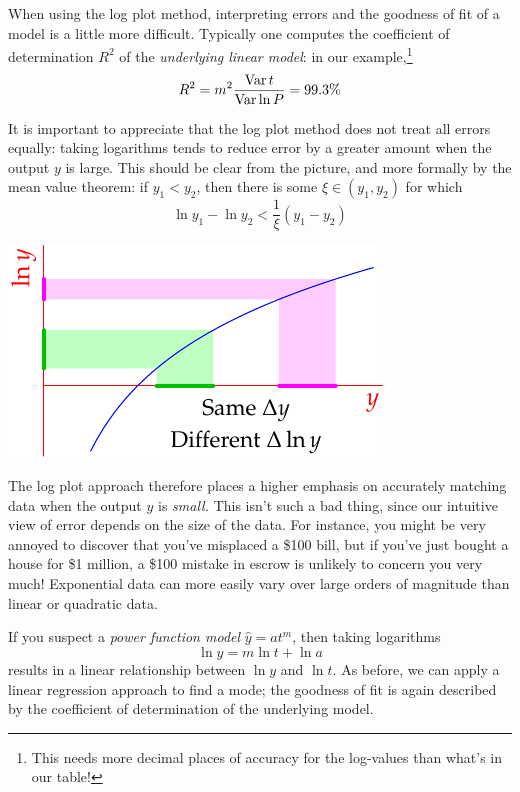 When using the log plot method, interpreting errors and the goodness of fit of a model is a little more difficult. Typically one computes the coefficient of determination $R^2$ of the \emph{underlying linear model}: in our example,\footnote{This needs more decimal places of accuracy for the log-values than what's in our table!}
\[
	R^2=m^2\frac{\operatorname{Var} t}{\operatorname{Var}\ln P}=99.3\%
\]
\begin{minipage}[t]{0.6\linewidth}\vspace{0pt}
	It is important to appreciate that the log plot method does not treat all errors equally: taking logarithms tends to reduce error by a greater amount when the output  $y$ is large. This should be clear from the picture, and more formally by the mean value theorem: if $y_1<y_2$, then there is some $\xi\in(y_1,y_2)$ for which 
	\[
		\ln y_1-\ln y_2<\frac 1{\xi}(y_1-y_2)
	\]
\end{minipage}
\hfill
\begin{minipage}[t]{0.39\linewidth}\vspace{0pt}
	\flushright\includegraphics{logerror}
\end{minipage}
\medbreak

The log plot approach therefore places a higher emphasis on accurately matching data when the output $y$ is \emph{small.} This isn't such a bad thing, since our intuitive view of error depends on the size of the data. For instance, you might be very annoyed to discover that you've misplaced a \$100 bill, but if you've just bought a house for \$1 million, a \$100 mistake in escrow is unlikely to concern you very much! Exponential data can more easily vary over large orders of magnitude than linear or quadratic data. 

\goodbreak


If you suspect a \emph{power function model} $\hat y=at^m$, then taking logarithms
\[
	\ln\hat y=m\ln t+\ln a
\]
results in a linear relationship between $\ln y$ and $\ln t$. As before, we can apply a linear regression approach to find a mode; the goodness of fit is again described by the coefficient of determination of the underlying model. 


